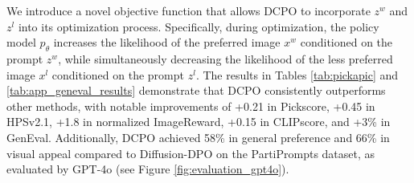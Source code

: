 We introduce a novel objective function that allows DCPO to incorporate $z^w$ and $z^l$ into its optimization process. Specifically, during optimization, the policy model $p_\theta$ increases the likelihood of the preferred image $x^w$ conditioned on the prompt $z^w$, while simultaneously decreasing the likelihood of the less preferred image $x^l$ conditioned on the prompt $z^l$. The results in Tables \ref{tab:pickapic} and \ref{tab:app_geneval_results} demonstrate that DCPO consistently outperforms other methods, with notable improvements of +0.21 in Pickscore, +0.45 in HPSv2.1, +1.8 in normalized ImageReward, +0.15 in CLIPscore, and +3\% in GenEval. Additionally, DCPO achieved 58\% in general preference and 66\% in visual appeal compared to Diffusion-DPO on the PartiPrompts dataset, as evaluated by GPT-4o (see Figure \ref{fig:evaluation_gpt4o}).





